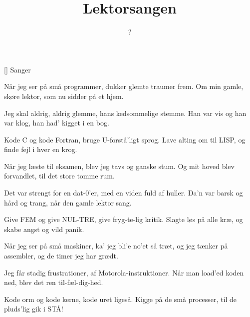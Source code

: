 \documentclass[a4paper,11pt]{article}
\title{Lektorsangen}
\author{?}
\begin{document}
\maketitle

\begin{roles}
[] Sanger
\end{roles}


\begin{song}
%
Når jeg ser på små programmer,
dukker glemte traumer frem.
Om min gamle, skøre lektor,
som nu sidder på et hjem.

Jeg skal aldrig, aldrig glemme,
hans kedsommelige stemme.
Han var vis og han var klog,
han had' kigget i en bog.

Kode C og kode Fortran,
bruge U-forstå'ligt sprog.
Lave alting om til LISP,
og finde fejl i hver en krog.

Når jeg læste til eksamen,
blev jeg tavs og ganske stum.
Og mit hoved blev forvandlet,
til det store tomme rum.

Det var strengt for en dat-0'er,
med en viden fuld af huller.
Da'n var barsk og hård og trang,
når den gamle lektor sang.

Give FEM og give NUL-TRE,
give fryg-te-lig kritik.
Slagte løs på alle kræ,
og skabe angst og vild panik.

Når jeg ser på små maskiner,
ka' jeg bli'e no'et så træt,
og jeg tænker på assembler,
og de timer jeg har grædt.

Jeg får stadig frustrationer,
af Motorola-instruktioner.
Når man load'ed koden ned,
blev det ren til-fæl-dig-hed.

Kode orm og kode kerne,
kode uret ligeså.
Kigge på de små processer,
til de pluds'lig gik i STÅ!
\end{song}
\end{document}
